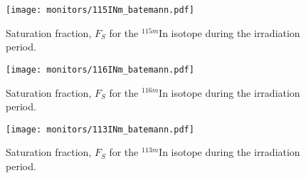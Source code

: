 \begin{figure}[htb]
\texttt{[image: monitors/115INm\_batemann.pdf]}
\caption{Saturation fraction, $F_S$ for the $^{115m}$In isotope during the irradiation period.
}
\label{fig:115INm_batemann}
\end{figure}

\begin{figure}[htb]
\texttt{[image: monitors/116INm\_batemann.pdf]}
\caption{Saturation fraction, $F_S$ for the $^{116m}$In isotope during the irradiation period.
}
\label{fig:116INm_batemann}
\end{figure}

\begin{figure}[htb]
\texttt{[image: monitors/113INm\_batemann.pdf]}
\caption{Saturation fraction, $F_S$ for the $^{113m}$In isotope during the irradiation period.
}
\label{fig:113INm_batemann}
\end{figure}

